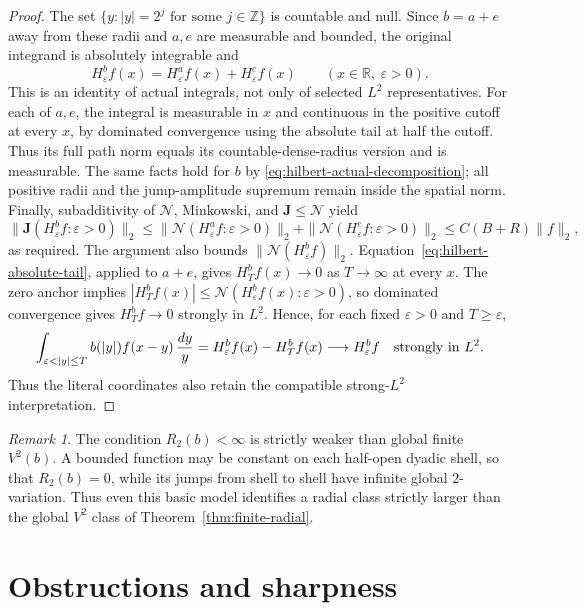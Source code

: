 \documentclass[11pt]{article}
\numberwithin{equation}{section}
\theoremstyle{remark}
\newtheorem{remark}[theorem]{Remark}
\theoremstyle{definition}
\newcommand{\R}{\mathbb R}
\newcommand{\NN}{\mathcal N}
\begin{document}
\begin{proof}
The set $\{y:|y|=2^j\text{ for some }j\in\mathbb Z\}$ is countable
and null. Since $b=a+e$ away from these radii and $a,e$ are measurable
and bounded, the original integrand is absolutely integrable and
\begin{equation}\label{eq:hilbert-actual-decomposition}
 H^b_\varepsilon f(x)=H^a_\varepsilon f(x)+H^e_\varepsilon f(x)
 \qquad(x\in\R,\ \varepsilon>0).
\end{equation}
This is an identity of actual integrals, not only of selected $L^2$
representatives. For each of $a,e$, the integral is measurable in $x$
and continuous in the positive cutoff at every $x$, by dominated
convergence using the absolute tail at half the cutoff. Thus its
full path norm equals its countable-dense-radius version and is
measurable. The same facts hold for $b$ by
\eqref{eq:hilbert-actual-decomposition}; all positive radii and the
jump-amplitude supremum remain inside the spatial norm.
Finally, subadditivity of $\NN$, Minkowski, and $\mathbf J\le\NN$
yield
\[
 \|\mathbf J(H^b_\varepsilon f:\varepsilon>0)\|_2
 \le\|\NN(H^a_\varepsilon f:\varepsilon>0)\|_2
     +\|\NN(H^e_\varepsilon f:\varepsilon>0)\|_2
 \le C(B+R)\|f\|_2,
\]
as required. The argument also bounds $\|\NN(H^b_\varepsilon f)\|_2$.
Equation~\eqref{eq:hilbert-absolute-tail}, applied to $a+e$, gives
$H^b_Tf(x)\to0$ as $T\to\infty$ at every $x$. The zero anchor implies
$|H^b_Tf(x)|\le\NN(H^b_\varepsilon f(x):\varepsilon>0)$, so dominated
convergence gives $H^b_Tf\to0$ strongly in $L^2$. Hence, for each
fixed $\varepsilon>0$ and $T\ge\varepsilon$,
\[
 \int_{\varepsilon<|y|\le T}b(|y|)f(x-y)\,\frac{dy}{y}
 =H^b_\varepsilon f(x)-H^b_Tf(x)
 \longrightarrow H^b_\varepsilon f
 \quad\hbox{strongly in }L^2.
\]
Thus the literal coordinates also retain the compatible strong-$L^2$
interpretation.
\end{proof}

\begin{remark}\label{rem:hilbert-shellwise-sharper}
The condition $R_2(b)<\infty$ is strictly weaker than global finite
$V^2(b)$.  A bounded function may be constant on each half-open dyadic
shell, so that $R_2(b)=0$, while its jumps from shell to shell have infinite
global $2$-variation.  Thus even this basic model identifies a radial class
strictly larger than the global $V^2$ class of Theorem~\ref{thm:finite-radial}.
\end{remark}


\section{Obstructions and sharpness}
\label{sec:sharpness-obstructions}
\end{document}
